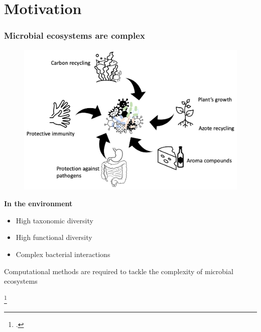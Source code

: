 \documentclass[8pt,usenames,dvipsnames]{beamer}
\begin{document}
\section{Motivation}
\begin{frame}
\frametitle{Microbial ecosystems are complex}
\begin{minipage}{0.6\textwidth}
\begin{figure}
\includegraphics[width=\textwidth]{figures/bacterial-env.pdf}
\end{figure}
\end{minipage}%
\begin{minipage}{0.4\textwidth}
\textbf{In the environment}
\begin{itemize}
\item High taxonomic diversity  \\

\item High functional diversity \\

\item Complex bacterial interactions
\end{itemize}

\end{minipage}
\begin{alertblock}{}
\centering
Computational methods are required to tackle the complexity of microbial ecosystems
\end{alertblock}

 \tiny\footcite*{10.1093/chemse/bjh067,BELKAID2014121,Zhang2015,Hoorman2011,McSweeney2000}
\end{frame}
\end{document}
